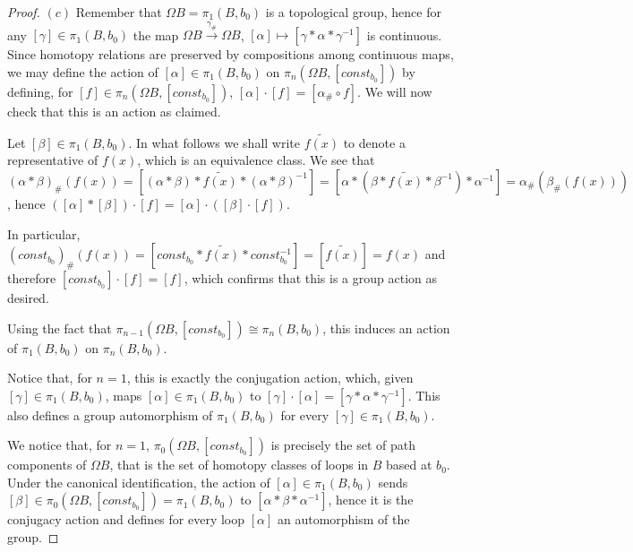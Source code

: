 \documentclass{article}
\begin{document}
\begin{proof}
    $(c)$ Remember that $\Omega B=\pi_1(B,b_0)$ is a topological group, hence
    for any $[\gamma]\in\pi_1(B,b_0)$ the map $\Omega
    B\xrightarrow{\gamma_\#}\Omega B$, $[\alpha]\mapsto 
    [\gamma*\alpha*\gamma^{-1}]$ is continuous. Since homotopy relations are
    preserved by compositions among continuous
    maps, we may define the action of $[\alpha]\in\pi_1(B,b_0)$ on $\pi_n(\Omega
    B,[const_{b_0}])$ by defining, for $[f]\in\pi_n(\Omega B,[const_{b_0}])$,
    $[\alpha]\cdot [f]=[\alpha_\#\circ f]$. We will now check that this is an
    action as claimed.

    Let $[\beta]\in\pi_1(B,b_0)$. In what follows we shall write $\tilde{f(x)}$
    to denote a representative of $f(x)$, which is an equivalence class. We see
    that
    $(\alpha*\beta)_\#(f(x))=[(\alpha*\beta)*\tilde{f(x)}*(\alpha*\beta)^{-1}]=
[\alpha*(\beta*\tilde{f(x)}*\beta^{-1})*\alpha^{-1}]=\alpha_\#(\beta_\#(f(x)))$, hence
    $([\alpha]*[\beta])\cdot [f]=[\alpha]\cdot ([\beta]\cdot [f])$.

    In particular,
    $(const_{b_0})_\#(f(x))=[const_{b_0}*\tilde{f(x)}*const_{b_0}^{-1}]=[\tilde{f(x)}]=f(x)$
    and therefore $[const_{b_0}]\cdot [f]=[f]$,
    which confirms that this is a group action as desired.
    
    Using the fact that $\pi_{n-1}(\Omega B,[const_{b_0}])\cong\pi_n(B,b_0)$,
    this induces an action of $\pi_1(B,b_0)$ on $\pi_n(B,b_0)$.

    Notice that, for $n=1$, this is exactly the conjugation action, which, given
    $[\gamma]\in\pi_1(B,b_0)$, maps $[\alpha]\in\pi_1(B,b_0)$ to $[\gamma]\cdot
    [\alpha]=[\gamma*\alpha*\gamma^{-1}]$. This also defines a group
    automorphism of $\pi_1(B,b_0)$ for every $[\gamma]\in\pi_1(B,b_0)$.

    We notice that, for $n=1$, $\pi_0(\Omega B,[const_{b_0}])$ is precisely the
    set of path components of $\Omega B$, that is the set of homotopy classes of
    loops in $B$ based at $b_0$. Under the canonical identification, the action
    of $[\alpha]\in\pi_1(B,b_0)$ sends $[\beta]\in\pi_0(\Omega
    B,[const_{b_0}])=\pi_1(B,b_0)$ to $[\alpha*\beta*\alpha^{-1}]$, hence it is
    the conjugacy action and defines for every loop $[\alpha]$ an automorphism
    of the group.
\end{proof}

\printbibliography
\end{document}
